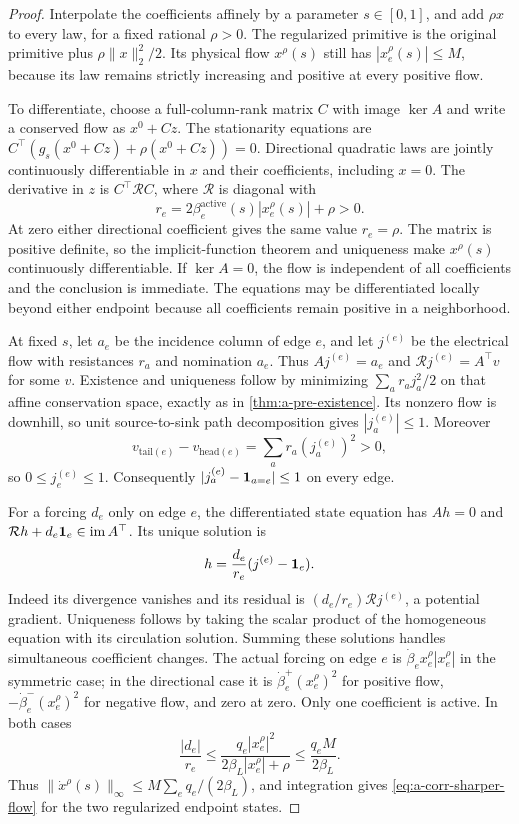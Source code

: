 \begin{proof}
Interpolate the coefficients affinely by a parameter $s\in[0,1]$, and
add $\rho x$ to every law, for a fixed rational $\rho>0$. The regularized
primitive is the original primitive plus $\rho\|x\|_2^2/2$. Its physical
flow $x^\rho(s)$ still has $|x_e^\rho(s)|\le M$, because its law remains
strictly increasing and positive at every positive flow.

To differentiate, choose a full-column-rank matrix $C$ with image $\ker A$ and write a conserved
flow as $x^0+Cz$. The stationarity equations are
$C^\top(g_s(x^0+Cz)+\rho(x^0+Cz))=0$. Directional quadratic laws are
jointly continuously differentiable in $x$ and their coefficients,
including $x=0$. The derivative in $z$ is $C^\top\mathcal R C$, where
$\mathcal R$ is diagonal with
\[
 r_e=2\beta_e^{\mathrm{active}}(s)|x_e^\rho(s)|+\rho>0.
\]
At zero either directional coefficient gives the same value $r_e=\rho$.
The matrix is positive definite, so the implicit-function theorem and
uniqueness make $x^\rho(s)$ continuously differentiable. If $\ker A=0$,
the flow is independent of all coefficients and the conclusion is
immediate. The equations may be differentiated locally beyond either
endpoint because all coefficients remain positive in a neighborhood.

At fixed $s$, let $a_e$ be the incidence column of edge $e$, and let
$j^{(e)}$ be the electrical flow with resistances $r_a$ and nomination
$a_e$. Thus $Aj^{(e)}=a_e$ and $\mathcal Rj^{(e)}=A^\top v$ for some
$v$. Existence and uniqueness follow by minimizing
$\sum_a r_a j_a^2/2$ on that affine conservation space, exactly as in
\cref{thm:a-pre-existence}. Its nonzero flow is downhill, so unit
source-to-sink path decomposition gives $|j_a^{(e)}|\le1$. Moreover
\[
 v_{\mathrm{tail}(e)}-v_{\mathrm{head}(e)}
 =\sum_a r_a(j_a^{(e)})^2>0,
\]
so $0\le j_e^{(e)}\le1$. Consequently
$|j_a^{(e)}-\mathbf{1}_{a=e}|\le1$ on every edge.

For a forcing $d_e$ only on edge $e$, the differentiated state equation
has $Ah=0$ and $\mathcal R h+d_e\mathbf{1}_e\in\operatorname{im}A^\top$.
Its unique solution is
\[
 h=\frac{d_e}{r_e}(j^{(e)}-\mathbf{1}_e).
\]
Indeed its divergence vanishes and its residual is
$(d_e/r_e)\mathcal R j^{(e)}$, a potential gradient. Uniqueness follows
by taking the scalar product of the homogeneous equation with its
circulation solution. Summing these solutions handles simultaneous
coefficient changes. The actual forcing on edge $e$ is
$\dot\beta_e x_e^\rho|x_e^\rho|$ in the symmetric case; in the
directional case it is $\dot\beta_e^+(x_e^\rho)^2$ for positive flow,
$-\dot\beta_e^-(x_e^\rho)^2$ for negative flow, and zero at zero.
Only one coefficient is active. In both cases
\[
 \frac{|d_e|}{r_e}\le
 \frac{q_e|x_e^\rho|^2}{2\beta_L|x_e^\rho|+\rho}
 \le\frac{q_eM}{2\beta_L}.
\]
Thus $\|\dot x^\rho(s)\|_\infty\le
M\sum_e q_e/(2\beta_L)$, and integration gives
\cref{eq:a-corr-sharper-flow} for the two regularized endpoint states.


\end{proof}
